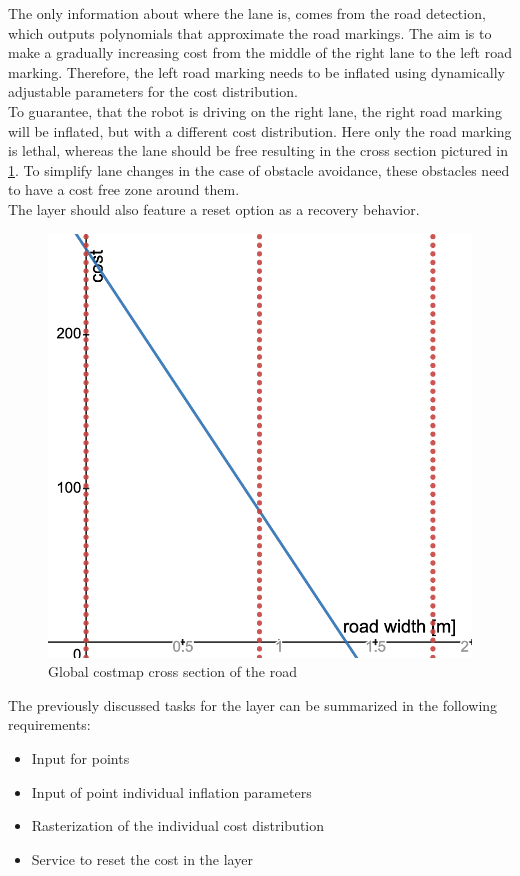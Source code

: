 The only information about where the lane is, comes from the road detection, which outputs polynomials that approximate the road markings. The aim is to make a gradually increasing cost from the middle of the right lane to the left road marking. Therefore, the left road marking needs to be inflated using dynamically adjustable parameters for the cost distribution.\\


To guarantee, that the robot is driving on the right lane, the right road marking will be inflated, but with a different cost distribution. Here only the road marking is lethal, whereas the lane should be free resulting in the cross section pictured in \ref{globalcostdistro}. To simplify lane changes in the case of obstacle avoidance, these obstacles need to have a cost free zone around them.\\

The layer should also feature a reset option as a recovery behavior.

\begin{figure} 
	\centering
	\includegraphics[width=.8\textwidth]{Pictures/global stage cost distro}
	\caption{Global costmap cross section of the road}
	\label{globalcostdistro}
\end{figure}



The previously discussed tasks for the layer can be summarized in the following requirements:

\begin{itemize}
	\item Input for points
	\item Input of point individual inflation parameters
	\item Rasterization of the individual cost distribution
	\item Service to reset the cost in the layer
\end{itemize}



